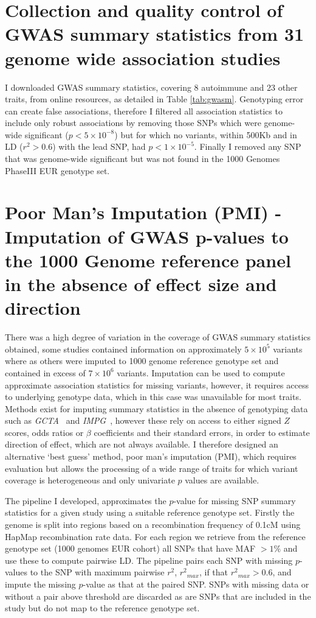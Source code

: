 \documentclass[a4paper,11pt]{report}
\begin{document}
\section{Collection and quality control of GWAS summary statistics from 31 genome wide association studies}
I downloaded GWAS summary statistics, covering 8 autoimmune and 23 other traits, from online resources, as detailed in Table \ref{tab:gwasm}. Genotyping error can create false associations,  therefore I filtered all association statistics to include only robust associations by removing those SNPs which were genome-wide significant ($p < 5 \times 10^{-8}$) but for which no variants, within 500Kb and in LD ($r^{2} > 0.6$) with the lead SNP, had $p < 1 \times 10^{-5}$. Finally I removed any SNP that was genome-wide significant but was not found in the 1000 Genomes PhaseIII EUR genotype set. 
\section{Poor Man's Imputation (PMI) - Imputation of GWAS p-values to the 1000 Genome reference panel in the absence of effect size and direction}
There was a high degree of variation in the coverage of GWAS summary statistics obtained, some studies contained information on approximately $5 \times 10^5$ variants where as others were imputed to 1000 genome reference genotype set and contained in excess of $7 \times 10^6$ variants. Imputation can be used to compute approximate association statistics for missing variants, however, it requires access to underlying genotype data, which in this case was unavailable for most traits. Methods exist for imputing summary statistics in the absence of genotyping data such as \textit{GCTA}~\citep{YangLeeGoddardEtAl2011} and \textit{IMPG}~\citep{Pasaniuc2014-im}, however these rely on access to either signed $Z$ scores, odds ratios or $\beta$ coefficients and their standard errors, in order to estimate direction of effect, which are not always available. I therefore designed an alternative `best guess' method, poor man's imputation (PMI), which requires evaluation but allows the processing of a wide range of traits for which variant coverage is heterogeneous and only univariate $p$ values are available.

The pipeline I developed, approximates the $p$-value for missing SNP summary statistics for a given study using a suitable reference genotype set. Firstly the genome is split into regions based on a recombination frequency of 0.1cM using HapMap recombination rate data. For each region we retrieve from the reference genotype set (1000 genomes EUR cohort) all SNPs that have MAF $ > 1\%$ and use these to compute pairwise LD. The pipeline pairs each SNP with missing $p$-values to the SNP with maximum pairwise $r^2$, ${r^2}_{max}$, if that ${r^2}_{max} > 0.6$, and impute the missing $p$-value as that at the paired SNP. SNPs with missing data or without a pair above threshold are discarded as are SNPs that are included in the study but do not map to the reference genotype set.
\end{document}
